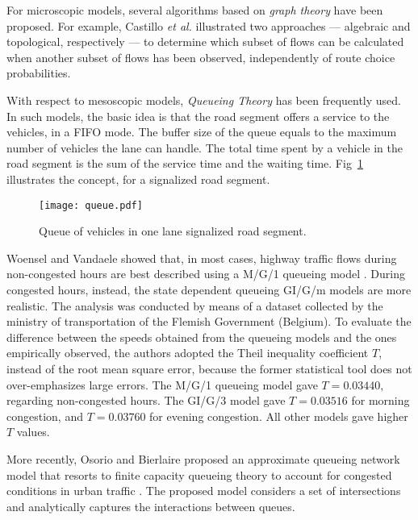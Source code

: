 \documentclass[10pt,onecolumn]{article}
\begin{document}
For microscopic models, several algorithms based on \textit{graph theory} have been proposed. For example, Castillo \textit{et al.} \cite{Castillo2008} illustrated two approaches --- algebraic and topological, respectively ---  to determine which subset of flows can be calculated when another subset of flows has been observed, independently of route choice probabilities.

With respect to mesoscopic models, \textit{Queueing Theory} has been frequently used. 
In such models, the basic idea is that the road segment offers a service to the vehicles, in a FIFO mode. The buffer size of the queue equals to the maximum number of vehicles the lane can handle.
The total time spent by a vehicle in the road segment is the sum of the service time and the waiting time. 
Fig~\ref{fig:queue} illustrates the concept, for a signalized road segment.

\begin{figure}[h]
\centering
\texttt{[image: queue.pdf]}
\caption{Queue of vehicles in one lane signalized road segment.}
\label{fig:queue}
\end{figure} 

Woensel and Vandaele showed that, in most cases, highway traffic flows during non-congested hours are best described using a M/G/1 queueing model \cite{Woensel2006}. 
During congested hours, instead, the state dependent queueing GI/G/m models are more realistic. 
The analysis was conducted by means of a dataset collected by the ministry of transportation of the Flemish Government (Belgium). To evaluate the difference between the speeds obtained from the queueing models and the ones empirically observed, the authors adopted the Theil inequality coefficient $T$, instead of the root mean square error, because the former statistical tool does not over-emphasizes large errors. The M/G/1 queueing model gave $T = 0.03440$, regarding non-congested hours. The GI/G/3 model gave $T = 0.03516$ for morning congestion, and $T = 0.03760$ for evening congestion. All other models gave higher $T$ values.

More recently, Osorio and Bierlaire proposed an approximate queueing network model that resorts to finite capacity queueing theory to account for congested conditions in urban traffic \cite{Osorio2009}. The proposed model considers a set of intersections and analytically captures the interactions between queues. 
\end{document}
